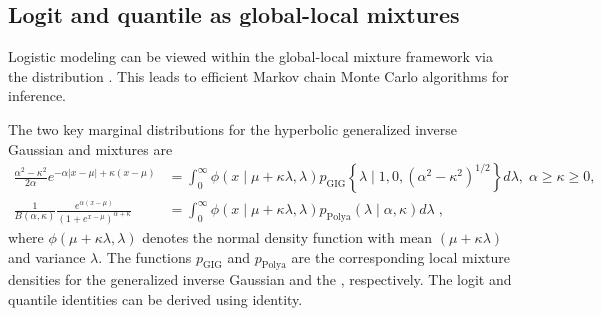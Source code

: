 \documentclass[lineno]{biometrika}
\begin{document}
\subsection{Logit and quantile as global-local mixtures}
Logistic modeling can be viewed within the global-local mixture framework via the \PG{} distribution \citep{polson_bayesian_2013}. This leads to efficient Markov chain Monte Carlo algorithms for inference. 
\begin{proposition}
The two key marginal distributions for the hyperbolic generalized inverse Gaussian \citep{barndorff1982normal} and \PG{} mixtures are
\begin{align}
 \frac{\alpha^2 - \kappa^2}{2\alpha} e^{-\alpha|x-\mu| + \kappa (x-\mu)} &= \int_0^{\infty} \phi(x \mid \mu + \kappa \lambda, \lambda) p_{\mathrm{GIG}}\left\{ \lambda \mid 1,0, (\alpha^2 - \kappa^2)^{1/2}\right\} d\lambda, \; \alpha \geq \kappa \geq 0, \label{eq:GIG}\\
\frac{1}{B(\alpha,\kappa)} \frac{e^{\alpha (x-\mu)}}{(1+e^{x-\mu})^{\alpha + \kappa}}&= \int_0^{\infty} \phi(x \mid \mu + \kappa \lambda, \lambda)p_{\mathrm{Polya}}(\lambda \mid \alpha,\kappa)  d\lambda\;, \label{eq:polya}
\end{align}
where $\phi(\mu + \kappa \lambda, \lambda)$ denotes the normal density function with mean $(\mu + \kappa \lambda)$ and variance $\lambda$.  The functions $p_{\mathrm{GIG}}$ and $p_{\mathrm{Polya}}$ are the corresponding local mixture densities for the generalized inverse Gaussian and the \PG{}, respectively. The logit and quantile identities can be derived using \CS{} identity. 
\end{proposition}
\end{document}
